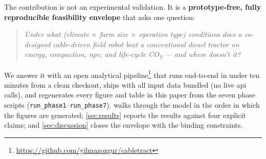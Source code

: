 \documentclass[11pt,a4paper]{article}
\newcommand{\cabletractrepo}{\url{https://github.com/yilmazozgur/cabletract}}
\begin{document}
The contribution is not an experimental validation. It is a \textbf{prototype-free, fully reproducible feasibility envelope} that asks one question:

\begin{quote}
\itshape Under what (climate $\times$ farm size $\times$ operation type) conditions does a co-designed cable-driven field robot beat a conventional diesel tractor on energy, compaction, \gls{npv}, and life-cycle CO\textsubscript{2} --- and where doesn't it?
\end{quote}

We answer it with an open analytical pipeline\footnote{\cabletractrepo} that runs end-to-end in under ten minutes from a clean checkout, ships with all input data bundled (no live \gls{api} calls), and regenerates every figure and table in this paper from the seven phase scripts (\texttt{run\_phase1}--\texttt{run\_phase7}).  walks through the model in the order in which the figures are generated; \cref{sec:results} reports the results against four explicit claims; and \cref{sec:discussion} closes the envelope with the binding constraints.
\end{document}
